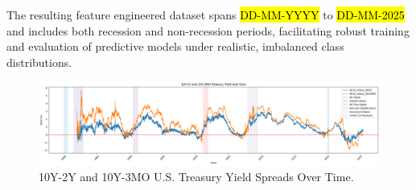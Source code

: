 The resulting feature engineered dataset spans \hl{DD-MM-YYYY} to \hl{DD-MM-2025} and includes both recession and non-recession periods, facilitating robust training and evaluation of predictive models under realistic, imbalanced class distributions. \\

\begin{figure}[htbp]
    \centering
    \includegraphics[width=\textwidth-3pt, height=\textheight, keepaspectratio]{Steps/Plots/10Y-2Y and 10Y-3MO Treasury Yield over time.png}
    \caption{10Y-2Y and 10Y-3MO U.S. Treasury Yield Spreads Over Time. %
    }
    \label{fig:yield-spreads}
\end{figure}

